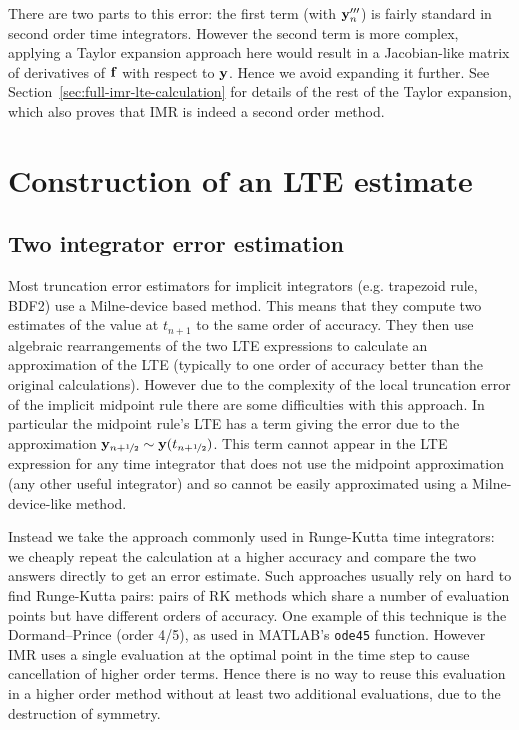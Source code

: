 There are two parts to this error: the first term (with $\mathbf{y}'''_n$) is fairly standard in second order time integrators.
However the second term is more complex, applying a Taylor expansion approach here would result in a Jacobian-like matrix of derivatives of ${\mathbf{f}}$ with respect to $\mathbf{y}$.
Hence we avoid expanding it further.
See Section~\ref{sec:full-imr-lte-calculation} for details of the rest of the Taylor expansion, which also proves that IMR is indeed a second order method.


\section{Construction of an LTE estimate}

\subsection{Two integrator error estimation}
\label{sec:two-integrator-error}

Most truncation error estimators for implicit integrators (e.g. trapezoid rule, BDF2) use a Milne-device based method.\cite[pgs 707-716]{Gresho-Sani}
This means that they compute two estimates of the value at $t_{n+1}$ to the same order of accuracy.
They then use algebraic rearrangements of the two LTE expressions to calculate an approximation of the LTE (typically to one order of accuracy better than the original calculations).
However due to the complexity of the local truncation error of the implicit midpoint rule there are some difficulties with this approach.
In particular the midpoint rule's LTE has a term giving the error due to the approximation $\mathbf{y}_{n+\nicefrac{1}{2}} \sim \mathbf{y}(t_{n+\nicefrac{1}{2}})$.
This term cannot appear in the LTE expression for any time integrator that does not use the midpoint approximation (\ie any other useful integrator) and so cannot be easily approximated using a Milne-device-like method.

Instead we take the approach commonly used in Runge-Kutta time integrators: we cheaply repeat the calculation at a higher accuracy and compare the two answers directly to get an error estimate.
Such approaches usually rely on hard to find Runge-Kutta pairs: pairs of RK methods which share a number of evaluation points but have different orders of accuracy.
One example of this technique is the Dormand–Prince (order 4/5), as used in MATLAB's \texttt{ode45} function.
However IMR uses a single evaluation at the optimal point in the time step to cause cancellation of higher order terms.
Hence there is no way to reuse this evaluation in a higher order method without at least two additional evaluations, due to the destruction of symmetry.

